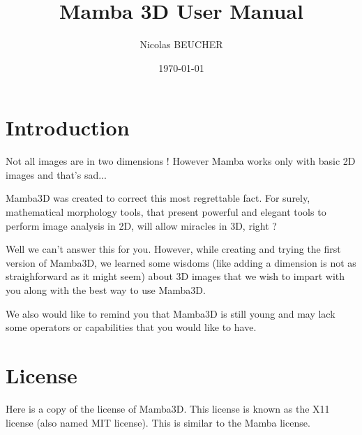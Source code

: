 \documentclass[a4paper,10pt,oneside]{article}
\title{Mamba 3D User Manual}
\author{Nicolas BEUCHER}
\date{\today}
\begin{document}
\mambaCover
\mambaContent

\section{Introduction}

Not all images are in two dimensions ! However Mamba works only with basic 2D
images and that's sad...

Mamba3D was created to correct this most regrettable fact. For surely,
mathematical morphology tools, that present powerful and elegant tools to 
perform image analysis in 2D, will allow miracles in 3D, right ? 

Well we can't answer this for you. However, while creating and trying the first
version of Mamba3D, we learned some wisdoms (like adding a dimension is not
as straighforward as it might seem) about 3D images that we wish to
impart with you along with the best way to use Mamba3D.

We also would like to remind you that Mamba3D is still young and may lack
some operators or capabilities that you would like to have.

\pagebreak

\section{License}
\label{cha:License}

Here is a copy of the license of Mamba3D. This license is known as the X11 license
(also named MIT license). This is similar to the Mamba license.

\vspace{0.5cm}
\end{document}
